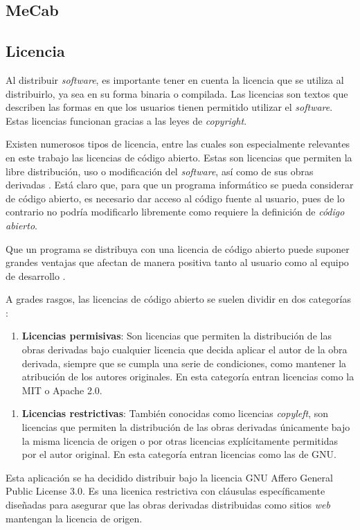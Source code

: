 \subsection{MeCab}

\subsection{Licencia}

Al distribuir \textit{software}, es importante tener en cuenta la licencia que se utiliza al distribuirlo, ya sea en su forma binaria o compilada. Las licencias son textos que describen las formas en que los usuarios tienen permitido utilizar el \textit{software}. Estas licencias funcionan gracias a las leyes de \textit{copyright}.

Existen numerosos tipos de licencia, entre las cuales son especialmente relevantes en este trabajo las licencias de código abierto. Estas son licencias que permiten la libre distribución, uso o modificación del \textit{software}, así como de sus obras derivadas \citationNeeded. Está claro que, para que un programa informático se pueda considerar de código abierto, es necesario dar acceso al código fuente al usuario, pues de lo contrario no podría modificarlo libremente como requiere la definición de \textit{código abierto}.

Que un programa se distribuya con una licencia de código abierto puede suponer grandes ventajas que afectan de manera positiva tanto al usuario como al equipo de desarrollo \autocite{almarzouq2005open, Heron2013}.

A grades rasgos, las licencias de código abierto se suelen dividir en dos categorías \citationNeeded:

\begin{enumerate}
	\item \textbf{Licencias permisivas}: Son licencias que permiten la distribución de las obras derivadas bajo cualquier licencia que decida aplicar el autor de la obra derivada, siempre que se cumpla una serie de condiciones, como mantener la atribución de los autores originales. En esta categoría entran licencias como la MIT o Apache 2.0.
\end{enumerate}

\begin{enumerate}
	\item \textbf{Licencias restrictivas}: También conocidas como licencias \textit{copyleft}, son licencias que permiten la distribución de las obras derivadas únicamente bajo la misma licencia de origen o por otras licencias explícitamente permitidas por el autor original. En esta categoría entran licencias como las de GNU.
\end{enumerate}

Esta aplicación se ha decidido distribuir bajo la licencia GNU Affero General Public License 3.0. Es una licenica restrictiva con cláusulas específicamente diseñadas para asegurar que las obras derivadas distribuidas como sitios \textit{web} mantengan la licencia de origen. \citationNeeded
